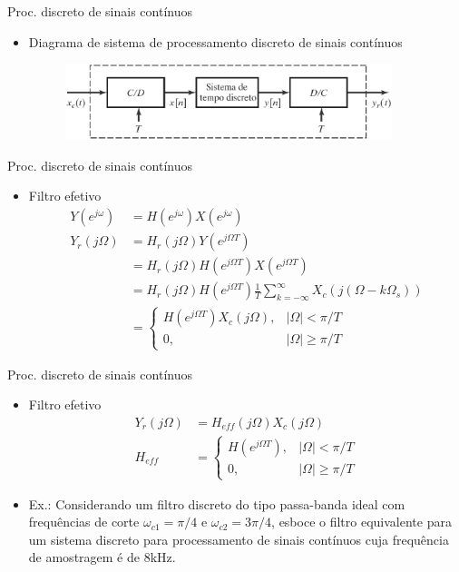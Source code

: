 \documentclass[
size=11pt,
paper=screen,
mode=present,
display=slidesnotes,
style=paintings,
nopagebreaks,
blackslide,
fleqn]{powerdot}
\begin{document}
\begin{slide}{Proc. discreto de sinais cont\'inuos}
\begin{itemize}
   \item Diagrama de sistema de processamento discreto de sinais cont\'inuos
   \begin{figure}
      \centering
      \includegraphics[width=0.9\textwidth]{figs/procdiscreto.eps}
   \end{figure}
\end{itemize}
\end{slide}

\begin{slide}{Proc. discreto de sinais cont\'inuos}
\begin{itemize}
   \item Filtro efetivo
   \begin{align}
      Y(e^{j\omega}) &= H(e^{j\omega}) X(e^{j\omega})\\
      Y_r(j\Omega)   &= H_r(j\Omega)Y(e^{j\Omega T})\\
                     &= H_r(j\Omega)H(e^{j\Omega T}) X(e^{j\Omega T})\\
                     &= H_r(j\Omega)H(e^{j\Omega T})\frac{1}{T}\sum_{k=-\infty}^{\infty}X_c(j(\Omega-k\Omega_s))\\
                     &= \begin{cases} H(e^{j\Omega T}) X_c(j\Omega), & |\Omega|<\pi /T \\
                                      0,                             & |\Omega|\geq\pi /T
                        \end{cases}
   \end{align}
\end{itemize}
\end{slide}

\begin{slide}{Proc. discreto de sinais cont\'inuos}
\begin{itemize}
   \item Filtro efetivo
   \begin{align}
      Y_r(j\Omega)   &= H_{eff}(j\Omega)X_c(j\Omega)\\
      H_{eff}        &= \begin{cases} H(e^{j\Omega T}), & |\Omega|<\pi /T \\
                                      0,                & |\Omega|\geq\pi /T
                        \end{cases}
   \end{align}
   \item Ex.: Considerando um filtro discreto do tipo passa-banda ideal com frequ\^encias de corte $\omega_{c1}=\pi/4$ e $\omega_{c2}=3\pi/4$, esboce o filtro equivalente para um sistema discreto para processamento de sinais cont\'inuos cuja frequ\^encia de amostragem \'e de $8$kHz. 
\end{itemize}
\end{slide}
\end{document}
